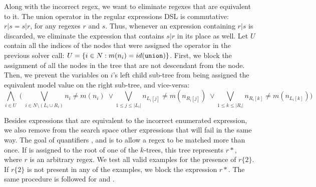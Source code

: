 Along with the incorrect regex, we want to eliminate regexes that are equivalent to it. The union operator in the regular expressions DSL is commutative: \(r|s = s|r\), for any regexes \(r\) and \(s\). Thus, whenever an expression containing \(r|s\) is discarded, we eliminate the expression that contains \(s|r\) in its place as well.
%
Let \(U\) contain all the indices of the nodes that were assigned the \Union{} operator in the previous solver call: \(U = \{i \in N: m(n_i) = id(\texttt{union}{})\}\). First, we block the assignment of all the nodes in the tree that are not descendant from the \Union{} node. Then, we prevent the variables on \(i\)'s left child sub-tree from being assigned the equivalent model value on the right sub-tree, and vice-versa:
\begin{equation}
\bigwedge_{i \in U} \;\Biggl(\;
\bigvee_{i \in N \setminus (L_i \cup R_i)} n_i \ne m(n_i) \;\lor
\bigvee_{1 \le j \le |L_i|} n_{L_i[j]} \ne m(n_{R_i[j]}) \;\lor
\bigvee_{1 \le k \le |R_i|} n_{R_i[k]} \ne m(n_{L_i[k]}) \Biggr)
\end{equation}

Besides expressions that are equivalent to the incorrect enumerated expression, we also remove from the search space other expressions that will fail in the same way. The goal of quantifiers \Kleene{}, \Posit{} and \Range{} is to allow a regex to be matched more than once. If \Kleene{} is assigned to the root of one of the \(k\)-trees, this tree represents \(r*\), where \(r\) is an arbitrary regex. We test all valid examples for the presence of \(r\{2\}\). If \(r\{2\}\) is not present in any of the examples, we block the expression \(r*\). The same procedure is followed for \Posit{} and \Range{}.



